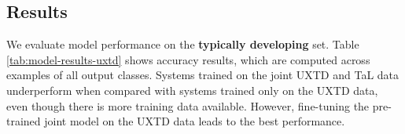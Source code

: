 \subsection{Results}

We evaluate model performance on the \textbf{typically developing} set.
Table \ref{tab:model-results-uxtd} shows accuracy results, which are computed across examples of all output classes.
Systems trained on the joint UXTD and TaL data underperform when compared with systems trained only on the UXTD data, 
even though there is more training data available.
However, fine-tuning the pre-trained joint model on the UXTD data leads to the best performance.

\begin{table}[t]
\centering
{}
\caption{Results for velar fronting error detection using the UXSSD velar samples rated by all annotators, except annotator 1.
Scores are computed using \enquote{velar} and \enquote{alveolar} as expected and competing classes respectively.}
\label{tab:model-results-velar}
\end{table}

